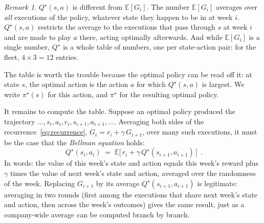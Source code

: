 \documentclass[11pt,a4paper]{article}
\theoremstyle{definition}
\theoremstyle{remark}
\newtheorem{remark}[definition]{Remark}
\numberwithin{equation}{section}
\newcommand{\E}{\mathbb{E}}
\begin{document}
\begin{remark}
$Q^\star(s, a)$ is different from $\E[G_i]$. The number $\E[G_i]$ averages over \emph{all}
executions of the policy, whatever state they happen to be in at week $i$. $Q^\star(s, a)$
restricts the average to the executions that pass through $s$ at week $i$ and are made to
play $a$ there, acting optimally afterwards. And while $\E[G_i]$ is a single number,
$Q^\star$ is a whole table of numbers, one per state-action pair: for the fleet,
$4 \times 3 = 12$ entries.
\end{remark}

The table is worth the trouble because the optimal policy can be read off it: at state $s$,
the optimal action is the action $a$ for which $Q^\star(s, a)$ is largest. We write
$\pi^\star(s)$ for this action, and $\pi^\star$ for the resulting optimal policy.

It remains to compute the table. Suppose an optimal policy produced the trajectory
$\dots, s_i, a_i, r_i, s_{i+1}, a_{i+1}, \dots$. Averaging both sides of the
recurrence~\eqref{eq:recurrence}, $G_i = r_i + \gamma\, G_{i+1}$, over many such executions,
it must be the case that the \emph{Bellman equation} holds:
\begin{equation}\label{eq:bellman}
\boxed{\;Q^\star(s_i, a_i) \;=\; \E\bigl[\, r_i + \gamma\, Q^\star(s_{i+1}, a_{i+1}) \,\bigr]\;}\,.
\end{equation}
In words: the value of this week's state and action equals this week's reward plus $\gamma$
times the value of next week's state and action, averaged over the randomness of the week.
Replacing $G_{i+1}$ by its average $Q^\star(s_{i+1}, a_{i+1})$ is legitimate: averaging in
two rounds (first among the executions that share next week's state and action, then across
the week's outcomes) gives the same result, just as a company-wide average can be computed
branch by branch.
\end{document}
